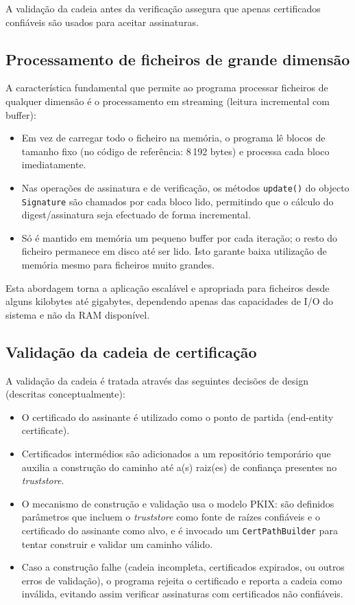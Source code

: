 A validação da cadeia antes da verificação assegura que apenas certificados confiáveis são usados para aceitar assinaturas.

\subsection{Processamento de ficheiros de grande dimensão}

A característica fundamental que permite ao programa processar ficheiros de qualquer dimensão é o processamento em streaming (leitura incremental com buffer):

\begin{itemize}
    \item Em vez de carregar todo o ficheiro na memória, o programa lê blocos de tamanho fixo (no código de referência: 8\,192 bytes) e processa cada bloco imediatamente.
    \item Nas operações de assinatura e de verificação, os métodos \texttt{update()} do objecto \texttt{Signature} são chamados por cada bloco lido, permitindo que o cálculo do digest/assinatura seja efectuado de forma incremental.
    \item Só é mantido em memória um pequeno buffer por cada iteração; o resto do ficheiro permanece em disco até ser lido. Isto garante baixa utilização de memória mesmo para ficheiros muito grandes.
\end{itemize}

Esta abordagem torna a aplicação escalável e apropriada para ficheiros desde alguns kilobytes até gigabytes, dependendo apenas das capacidades de I/O do sistema e não da RAM disponível.

\subsection{Validação da cadeia de certificação}

A validação da cadeia é tratada através das seguintes decisões de design (descritas conceptualmente):

\begin{itemize}
    \item O certificado do assinante é utilizado como o ponto de partida (end-entity certificate).
    \item Certificados intermédios são adicionados a um repositório temporário que auxilia a construção do caminho até a(s) raiz(es) de confiança presentes no \textit{truststore}.
    \item O mecanismo de construção e validação usa o modelo PKIX: são definidos parâmetros que incluem o \textit{truststore} como fonte de raízes confiáveis e o certificado do assinante como alvo, e é invocado um \texttt{CertPathBuilder} para tentar construir e validar um caminho válido.
    \item Caso a construção falhe (cadeia incompleta, certificados expirados, ou outros erros de validação), o programa rejeita o certificado e reporta a cadeia como inválida, evitando assim verificar assinaturas com certificados não confiáveis.
\end{itemize}

